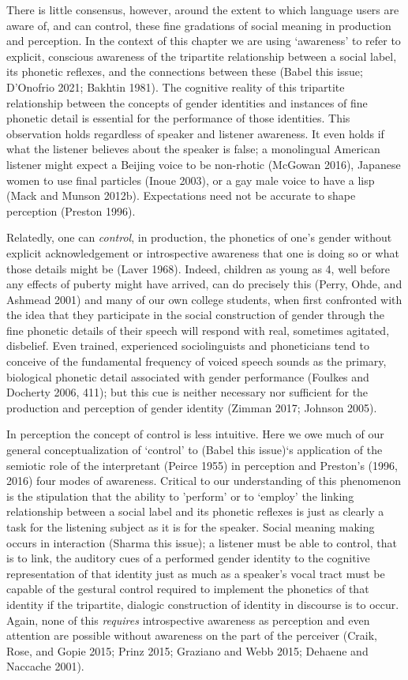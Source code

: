 \documentclass[
  letterpaper,
  DIV=11,
  numbers=noendperiod]{scrartcl}
\begin{document}
There is little consensus, however, around the extent to which language
users are aware of, and can control, these fine gradations of social
meaning in production and perception. In the context of this chapter we
are using `awareness' to refer to explicit, conscious awareness of the
tripartite relationship between a social label, its phonetic reflexes,
and the connections between these (Babel this issue; D'Onofrio 2021;
Bakhtin 1981). The cognitive reality of this tripartite relationship
between the concepts of gender identities and instances of fine phonetic
detail is essential for the performance of those identities. This
observation holds regardless of speaker and listener awareness. It even
holds if what the listener believes about the speaker is false; a
monolingual American listener might expect a Beijing voice to be
non-rhotic (McGowan 2016), Japanese women to use final particles (Inoue
2003), or a gay male voice to have a lisp (Mack and Munson 2012b).
Expectations need not be accurate to shape perception (Preston 1996).

Relatedly, one can \emph{control}, in production, the phonetics of one's
gender without explicit acknowledgement or introspective awareness that
one is doing so or what those details might be (Laver 1968). Indeed,
children as young as 4, well before any effects of puberty might have
arrived, can do precisely this (Perry, Ohde, and Ashmead 2001) and many
of our own college students, when first confronted with the idea that
they participate in the social construction of gender through the fine
phonetic details of their speech will respond with real, sometimes
agitated, disbelief. Even trained, experienced sociolinguists and
phoneticians tend to conceive of the fundamental frequency of voiced
speech sounds as the primary, biological phonetic detail associated with
gender performance (Foulkes and Docherty 2006, 411); but this cue is
neither necessary nor sufficient for the production and perception of
gender identity (Zimman 2017; Johnson 2005).

In perception the concept of control is less intuitive. Here we owe much
of our general conceptualization of `control' to (Babel this issue)`s
application of the semiotic role of the interpretant (Peirce 1955) in
perception and Preston's (1996, 2016) four modes of awareness. Critical
to our understanding of this phenomenon is the stipulation that the
ability to 'perform' or to `employ' the linking relationship between a
social label and its phonetic reflexes is just as clearly a task for the
listening subject as it is for the speaker. Social meaning making occurs
in interaction (Sharma this issue); a listener must be able to control,
that is to link, the auditory cues of a performed gender identity to the
cognitive representation of that identity just as much as a speaker's
vocal tract must be capable of the gestural control required to
implement the phonetics of that identity if the tripartite, dialogic
construction of identity in discourse is to occur. Again, none of this
\emph{requires} introspective awareness as perception and even attention
are possible without awareness on the part of the perceiver (Craik,
Rose, and Gopie 2015; Prinz 2015; Graziano and Webb 2015; Dehaene and
Naccache 2001).
\end{document}

